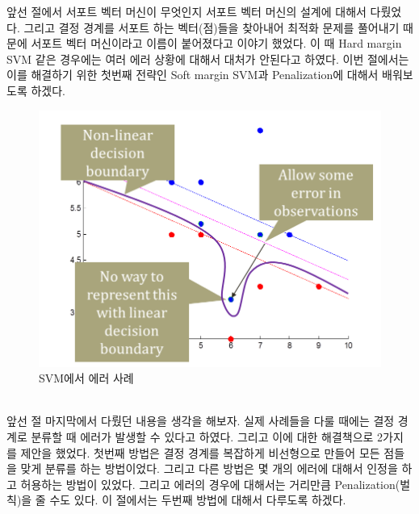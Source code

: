 \documentclass[a4paper]{oblivoir}
\begin{document}
\indent 앞선 절에서 서포트 벡터 머신이 무엇인지 서포트 벡터 머신의 설계에 대해서 다뤘었다. 그리고 결정 경계를 서포트 하는 벡터(점)들을 찾아내어 최적화 문제를 풀어내기 때문에 서포트 벡터 머신이라고 이름이 붙어졌다고 이야기 했었다. 이 때 Hard margin SVM 같은 경우에는 여러 에러 상황에 대해서 대처가 안된다고 하였다. 이번 절에서는 이를 해결하기 위한 첫번째 전략인 Soft margin SVM과 Penalization에 대해서 배워보도록 하겠다.\\
\begin{figure}[ht]\centering
\includegraphics[scale=0.5]{ErrorCase}\caption{SVM에서 에러 사례}\label{Fig:5-10}
\end{figure}\\
\indent 앞선 절 마지막에서 다뤘던 내용을 생각을 해보자. 실제 사례들을 다룰 때에는 결정 경계로 분류할 때 에러가 발생할 수 있다고 하였다. 그리고 이에 대한 해결책으로 2가지를 제안을 했었다. 첫번째 방법은 결정 경계를 복잡하게 비선형으로 만들어 모든 점들을 맞게 분류를 하는 방법이었다. 그리고 다른 방법은 몇 개의 에러에 대해서 인정을 하고 허용하는 방법이 있었다. 그리고 에러의 경우에 대해서는 거리만큼 Penalization(벌칙)을 줄 수도 있다. 이 절에서는 두번째 방법에 대해서 다루도록 하겠다.\\
\end{document}
